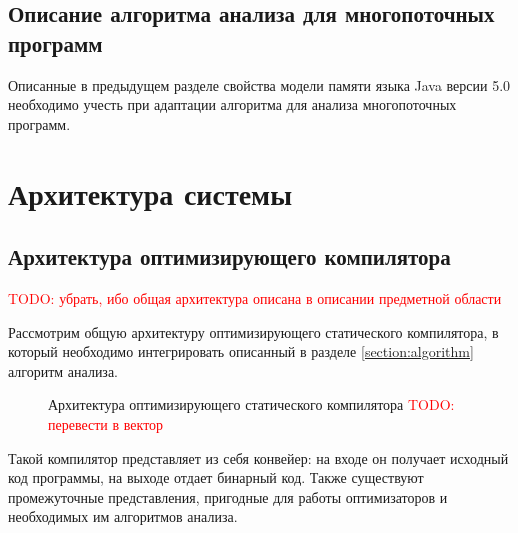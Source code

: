 \documentclass[14pt,titlepage]{extarticle}
\newcommand{\todo}[1]{\textcolor{red}{TODO: #1}}
\begin{document}
    \subsection{Описание алгоритма анализа для многопоточных программ}

      Описанные в предыдущем разделе свойства модели памяти языка Java версии
      5.0 необходимо учесть при адаптации алгоритма для анализа многопоточных
      программ.

  \newpage
  \section{Архитектура системы}

    \subsection{Архитектура оптимизирующего компилятора}

      \todo{убрать, ибо общая архитектура описана в описании предметной
      области}

      Рассмотрим общую архитектуру оптимизирующего статического компилятора,
      в который необходимо интегрировать описанный в разделе
      \ref{section:algorithm} алгоритм анализа.

      \begin{figure}[!htb]
        \caption{Архитектура оптимизирующего статического компилятора
                 \todo{перевести в вектор}}
        \label{fig:arch2}
      \end{figure}

      Такой компилятор представляет из себя конвейер: на входе он получает
      исходный код программы, на выходе отдает бинарный код. Также существуют
      промежуточные представления, пригодные для работы оптимизаторов и
      необходимых им алгоритмов анализа.
\end{document}
